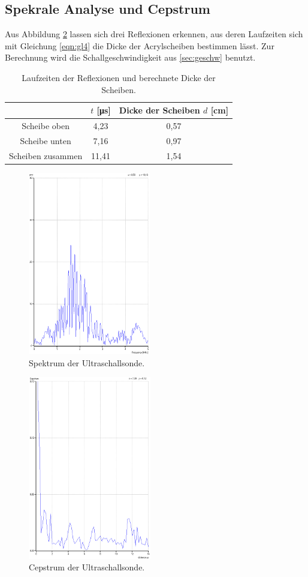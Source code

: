 \subsection{Spekrale Analyse und Cepstrum}
\label{sec:cep}

Aus Abbildung \ref{fig:cep} lassen sich drei Reflexionen erkennen, aus deren Laufzeiten sich mit Gleichung \eqref{eqn:gl4} die Dicke der Acrylscheiben bestimmen lässt.
Zur Berechnung wird die Schallgeschwindigkeit aus \ref{sec:geschw} benutzt.
\begin{table}
  \centering
  \caption{Laufzeiten der Reflexionen und berechnete Dicke der Scheiben.}
  \label{tab:cep}
  \begin{tabular}{c c c}
    \toprule
    & $t$ [\si{\micro\second}] & Dicke der Scheiben $d$ [\si{\centi\meter}] \\
    \midrule
    Scheibe oben & 4,23 & 0,57\\
    Scheibe unten & 7,16 & 0,97\\
    Scheiben zusammen & 11,41 & 1,54 \\
    \bottomrule
  \end{tabular}
\end{table}
\begin{figure}
  \centering
  \includegraphics[height=8cm]{data/FFT.png}
  \caption{Spektrum der Ultraschallsonde.}
  \label{fig:FFT}
\end{figure}
\begin{figure}
  \centering
  \includegraphics[height=8cm]{data/Cepstrum.png}
  \caption{Cepstrum der Ultraschallsonde.}
  \label{fig:cep}
\end{figure}

